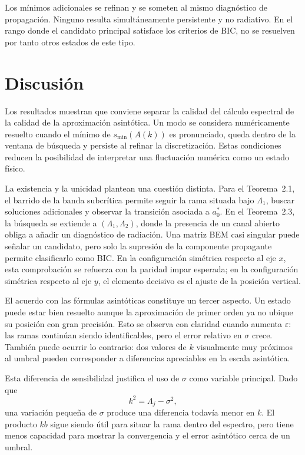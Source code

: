\documentclass[11pt]{article}
\begin{document}
Los mínimos adicionales se refinan y se someten al mismo diagnóstico de propagación. Ninguno resulta simultáneamente persistente y no radiativo. En el rango donde el candidato principal satisface los criterios de BIC, no se resuelven por tanto otros estados de este tipo.

\section{Discusión}

Los resultados muestran que conviene separar la calidad del cálculo espectral de la calidad de la aproximación asintótica. Un modo se considera numéricamente resuelto cuando el mínimo de \(s_{\min}(A(k))\) es pronunciado, queda dentro de la ventana de búsqueda y persiste al refinar la discretización. Estas condiciones reducen la posibilidad de interpretar una fluctuación numérica como un estado físico.

La existencia y la unicidad plantean una cuestión distinta. Para el Teorema~2.1, el barrido de la banda subcrítica permite seguir la rama situada bajo \(\Lambda_1\), buscar soluciones adicionales y observar la transición asociada a \(a_0^*\). En el Teorema~2.3, la búsqueda se extiende a \((\Lambda_1,\Lambda_2)\), donde la presencia de un canal abierto obliga a añadir un diagnóstico de radiación. Una matriz BEM casi singular puede señalar un candidato, pero solo la supresión de la componente propagante permite clasificarlo como BIC. En la configuración simétrica respecto al eje \(x\), esta comprobación se refuerza con la paridad impar esperada; en la configuración simétrica respecto al eje \(y\), el elemento decisivo es el ajuste de la posición vertical.

El acuerdo con las fórmulas asintóticas constituye un tercer aspecto. Un estado puede estar bien resuelto aunque la aproximación de primer orden ya no ubique su posición con gran precisión. Esto se observa con claridad cuando aumenta \(\varepsilon\): las ramas continúan siendo identificables, pero el error relativo en \(\sigma\) crece. También puede ocurrir lo contrario: dos valores de \(k\) visualmente muy próximos al umbral pueden corresponder a diferencias apreciables en la escala asintótica.

Esta diferencia de sensibilidad justifica el uso de \(\sigma\) como variable principal. Dado que
\[
k^2=\Lambda_j-\sigma^2,
\]
una variación pequeña de \(\sigma\) produce una diferencia todavía menor en \(k\). El producto \(kb\) sigue siendo útil para situar la rama dentro del espectro, pero tiene menos capacidad para mostrar la convergencia y el error asintótico cerca de un umbral.
\end{document}
